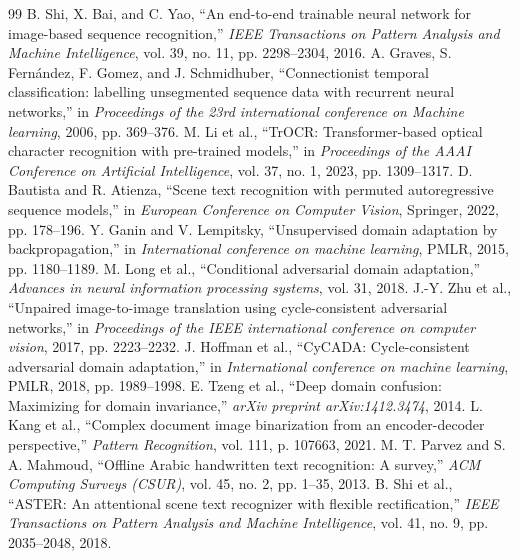 \documentclass[pdflatex,sn-mathphys-num]{sn-jnl}
\begin{document}
\begin{thebibliography}{99}
B. Shi, X. Bai, and C. Yao, ``An end-to-end trainable neural network for image-based sequence recognition,'' \textit{IEEE Transactions on Pattern Analysis and Machine Intelligence}, vol. 39, no. 11, pp. 2298--2304, 2016.
A. Graves, S. Fern{\'a}ndez, F. Gomez, and J. Schmidhuber, ``Connectionist temporal classification: labelling unsegmented sequence data with recurrent neural networks,'' in \textit{Proceedings of the 23rd international conference on Machine learning}, 2006, pp. 369--376.
M. Li et al., ``TrOCR: Transformer-based optical character recognition with pre-trained models,'' in \textit{Proceedings of the AAAI Conference on Artificial Intelligence}, vol. 37, no. 1, 2023, pp. 1309--1317.
D. Bautista and R. Atienza, ``Scene text recognition with permuted autoregressive sequence models,'' in \textit{European Conference on Computer Vision}, Springer, 2022, pp. 178--196.
Y. Ganin and V. Lempitsky, ``Unsupervised domain adaptation by backpropagation,'' in \textit{International conference on machine learning}, PMLR, 2015, pp. 1180--1189.
M. Long et al., ``Conditional adversarial domain adaptation,'' \textit{Advances in neural information processing systems}, vol. 31, 2018.
J.-Y. Zhu et al., ``Unpaired image-to-image translation using cycle-consistent adversarial networks,'' in \textit{Proceedings of the IEEE international conference on computer vision}, 2017, pp. 2223--2232.
J. Hoffman et al., ``CyCADA: Cycle-consistent adversarial domain adaptation,'' in \textit{International conference on machine learning}, PMLR, 2018, pp. 1989--1998.
E. Tzeng et al., ``Deep domain confusion: Maximizing for domain invariance,'' \textit{arXiv preprint arXiv:1412.3474}, 2014.
L. Kang et al., ``Complex document image binarization from an encoder-decoder perspective,'' \textit{Pattern Recognition}, vol. 111, p. 107663, 2021.
M. T. Parvez and S. A. Mahmoud, ``Offline Arabic handwritten text recognition: A survey,'' \textit{ACM Computing Surveys (CSUR)}, vol. 45, no. 2, pp. 1--35, 2013.
B. Shi et al., ``ASTER: An attentional scene text recognizer with flexible rectification,'' \textit{IEEE Transactions on Pattern Analysis and Machine Intelligence}, vol. 41, no. 9, pp. 2035--2048, 2018.

\end{thebibliography}
\end{document}
